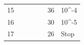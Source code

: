 \begin{table}[!ht]
\begin{tabular}{lllllll}
		\multicolumn{1}{l|}{15} &                              & \multicolumn{1}{l|}{}                              &                               & \multicolumn{1}{l|}{}                              & \cellcolor[HTML]{32CB00}36 & \cellcolor[HTML]{32CB00}10\textasciicircum{}-4 \\
		\multicolumn{1}{l|}{16} &                              & \multicolumn{1}{l|}{}                              &                               & \multicolumn{1}{l|}{}                              & \cellcolor[HTML]{32CB00}30 & \cellcolor[HTML]{32CB00}10\textasciicircum{}-5 \\
		\multicolumn{1}{l|}{17} &                              & \multicolumn{1}{l|}{}                              &                               & \multicolumn{1}{l|}{}                              & \cellcolor[HTML]{FD6864}26 & \cellcolor[HTML]{FD6864}Stop                   \\ \hline
	\end{tabular}
\end{table}
\pagebreak[4]

%
%





